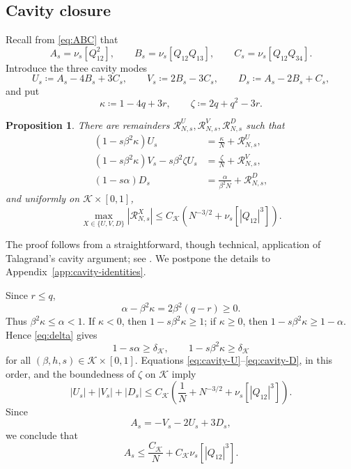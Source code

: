 \documentclass[11pt]{article}
\newtheorem{proposition}[theorem]{Proposition}
\numberwithin{equation}{section}
\newcommand{\1}{\mathbf 1}
\newcommand{\cK}{\mathcal K}
\begin{document}
\subsection{Cavity closure}\label{sec:cavityclosure}

Recall from \eqref{eq:ABC} that
\[
 A_s=\nu_s[Q_{12}^2],\qquad
 B_s=\nu_s[Q_{12}Q_{13}],\qquad
 C_s=\nu_s[Q_{12}Q_{34}].
\]
Introduce the three cavity modes
\begin{equation}
 U_s\coloneqq A_s-4B_s+3C_s,\qquad
 V_s\coloneqq2B_s-3C_s,\qquad
 D_s\coloneqq A_s-2B_s+C_s,
 \label{eq:cavity-modes}
\end{equation}
and put
\begin{equation}
 \kappa \coloneqq1-4q+3r,
 \qquad
 \zeta\coloneqq2q+q^2-3r.
 \label{eq:cavity-parameters}
\end{equation}

\begin{proposition}
\label{prop:cavity}
There are remainders
$\mathcal R^U_{N,s},\mathcal R^V_{N,s},\mathcal R^D_{N,s}$ such that
\begin{align}
 (1-s\beta^2\kappa )U_s
 &=\frac{\kappa }N+\mathcal R^U_{N,s},
 \label{eq:cavity-U}\\
 (1-s\beta^2\kappa )V_s-s\beta^2\zeta U_s
 &=\frac{\zeta}N+\mathcal R^V_{N,s},
 \label{eq:cavity-V}\\
 (1-s\alpha)D_s
 &=\frac{\alpha}{\beta^2N}+\mathcal R^D_{N,s},
 \label{eq:cavity-D}
\end{align}
and uniformly on $\cK\times[0,1]$,
\begin{equation}
 \max_{X\in\{U,V,D\}}|\mathcal R^X_{N,s}|
 \le C_{\cK}(N^{-3/2}+\nu_s[|Q_{12}|^3]).
 \label{eq:cavity-remainders}
\end{equation}
\end{proposition}

The proof follows from a straightforward, though technical, application of Talagrand's cavity argument; see \cite[Chapter~1]{Talagrand}. We postpone the details to Appendix~\ref{app:cavity-identities}.

Since $r\le q$,
\[
 \alpha-\beta^2\kappa
 =
 2\beta^2(q-r)\ge0.
\]
Thus $\beta^2\kappa \le\alpha<1$.  If $\kappa <0$, then
$1-s\beta^2\kappa \ge1$; if $\kappa \ge0$, then
$1-s\beta^2\kappa \ge1-\alpha$.  Hence \eqref{eq:delta} gives
\begin{equation}
 1-s\alpha\ge \delta _{\cK},
 \qquad
 1-s\beta^2\kappa \ge \delta _{\cK}
 \label{eq:denominator-bounds}
\end{equation}
for all $(\beta,h,s)\in\cK\times[0,1]$.
Equations \eqref{eq:cavity-U}--\eqref{eq:cavity-D}, in this order,
and the boundedness of $\zeta$ on $\cK$ imply
\[
 |U_s|+|V_s|+|D_s|
 \le C_{\cK}\left(\frac1N+N^{-3/2}+\nu_s[|Q_{12}|^3]\right).
\]
Since
\[
 A_s=-V_s-2U_s+3D_s,
\]
we conclude that
\begin{equation}
 A_s\le \frac{C_{\cK}}N
 +C_{\cK}\nu_s[|Q_{12}|^3].
 \label{eq:preabsorb}
\end{equation}
\end{document}
